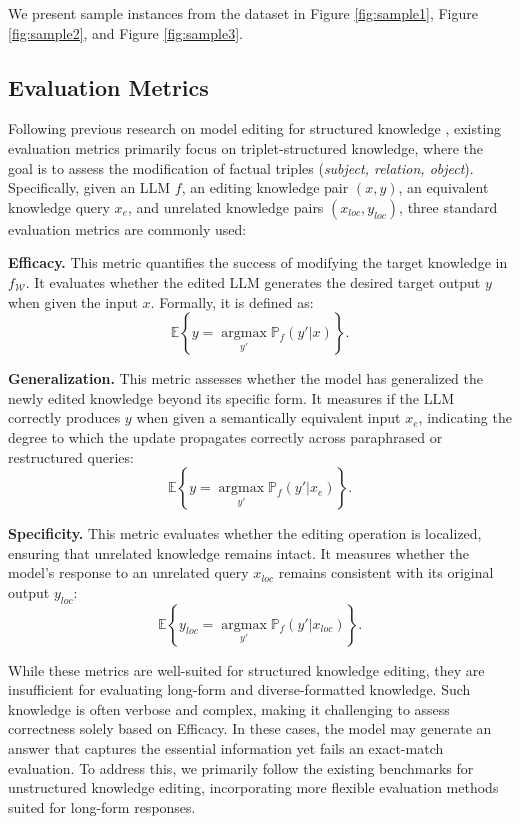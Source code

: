 We present sample instances from the dataset in Figure \ref{fig:sample1}, Figure \ref{fig:sample2}, and Figure \ref{fig:sample3}.

\subsection{Evaluation Metrics} \label{app:exp_metric}
Following previous research on model editing for structured knowledge \cite{ROME, MEND}, existing evaluation metrics primarily focus on triplet-structured knowledge, where the goal is to assess the modification of factual triples (\textit{subject, relation, object}). Specifically, given an LLM $f$, an editing knowledge pair $(x, y)$, an equivalent knowledge query $x_e$, and unrelated knowledge pairs $(x_{loc}, y_{loc})$, three standard evaluation metrics are commonly used:

\textbf{Efficacy.} This metric quantifies the success of modifying the target knowledge in $f_{\mathcal{W}}$. It evaluates whether the edited LLM generates the desired target output $y$ when given the input $x$. Formally, it is defined as:
\begin{equation}
\mathbb{E}\left\{y=\mathop{\arg\max}\limits_{y'}\mathbb{P}_{f}(y'\left|x\right.)\right\}.
\end{equation}

\textbf{Generalization.} This metric assesses whether the model has generalized the newly edited knowledge beyond its specific form. It measures if the LLM correctly produces $y$ when given a semantically equivalent input $x_e$, indicating the degree to which the update propagates correctly across paraphrased or restructured queries:
\begin{equation}
\mathbb{E}\left\{y=\mathop{\arg\max}\limits_{y'}\mathbb{P}_{f}(y'\left|x_e\right.)\right\}.
\end{equation}

\textbf{Specificity.} This metric evaluates whether the editing operation is localized, ensuring that unrelated knowledge remains intact. It measures whether the model's response to an unrelated query $x_{loc}$ remains consistent with its original output $y_{loc}$:
\begin{equation}
\mathbb{E}\left\{y_{loc}=\mathop{\arg\max}\limits_{y'}\mathbb{P}_{f}(y'\left|x_{loc}\right.)\right\}.
\end{equation}

While these metrics are well-suited for structured knowledge editing, they are insufficient for evaluating long-form and diverse-formatted knowledge. Such knowledge is often verbose and complex, making it challenging to assess correctness solely based on Efficacy. In these cases, the model may generate an answer that captures the essential information yet fails an exact-match evaluation. To address this, we primarily follow the existing benchmarks for unstructured knowledge editing, incorporating more flexible evaluation methods suited for long-form responses.

